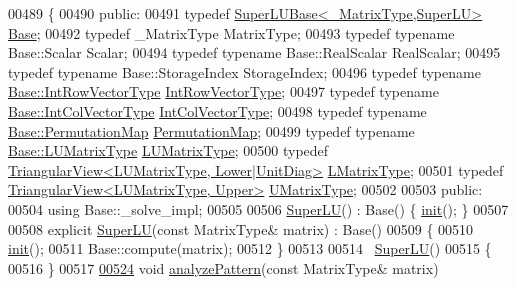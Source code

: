 \begin{DoxyCode}
00489 \{
00490   \textcolor{keyword}{public}:
00491     \textcolor{keyword}{typedef} \hyperlink{class_eigen_1_1_super_l_u_base}{SuperLUBase<\_MatrixType,SuperLU>} 
      \hyperlink{class_eigen_1_1_super_l_u_base}{Base};
00492     \textcolor{keyword}{typedef} \_MatrixType MatrixType;
00493     \textcolor{keyword}{typedef} \textcolor{keyword}{typename} Base::Scalar Scalar;
00494     \textcolor{keyword}{typedef} \textcolor{keyword}{typename} Base::RealScalar RealScalar;
00495     \textcolor{keyword}{typedef} \textcolor{keyword}{typename} Base::StorageIndex StorageIndex;
00496     \textcolor{keyword}{typedef} \textcolor{keyword}{typename} \hyperlink{group___core___module}{Base::IntRowVectorType} 
      \hyperlink{group___core___module}{IntRowVectorType};
00497     \textcolor{keyword}{typedef} \textcolor{keyword}{typename} \hyperlink{group___core___module}{Base::IntColVectorType} 
      \hyperlink{group___core___module}{IntColVectorType};   
00498     \textcolor{keyword}{typedef} \textcolor{keyword}{typename} \hyperlink{group___core___module_class_eigen_1_1_map}{Base::PermutationMap} \hyperlink{group___core___module_class_eigen_1_1_map}{PermutationMap};
00499     \textcolor{keyword}{typedef} \textcolor{keyword}{typename} \hyperlink{group___sparse_core___module}{Base::LUMatrixType} \hyperlink{group___sparse_core___module}{LUMatrixType};
00500     \textcolor{keyword}{typedef} \hyperlink{group___core___module_class_eigen_1_1_triangular_view}{TriangularView<LUMatrixType, Lower|UnitDiag>}  
      \hyperlink{group___core___module_class_eigen_1_1_triangular_view}{LMatrixType};
00501     \textcolor{keyword}{typedef} \hyperlink{group___core___module_class_eigen_1_1_triangular_view}{TriangularView<LUMatrixType,  Upper>}          
      \hyperlink{group___core___module_class_eigen_1_1_triangular_view}{UMatrixType};
00502 
00503   \textcolor{keyword}{public}:
00504     \textcolor{keyword}{using} Base::\_solve\_impl;
00505 
00506     \hyperlink{class_eigen_1_1_super_l_u}{SuperLU}() : Base() \{ \hyperlink{structinit}{init}(); \}
00507 
00508     \textcolor{keyword}{explicit} \hyperlink{class_eigen_1_1_super_l_u}{SuperLU}(\textcolor{keyword}{const} MatrixType& matrix) : Base()
00509     \{
00510       \hyperlink{structinit}{init}();
00511       Base::compute(matrix);
00512     \}
00513 
00514     ~\hyperlink{class_eigen_1_1_super_l_u}{SuperLU}()
00515     \{
00516     \}
00517     
\hyperlink{class_eigen_1_1_super_l_u_a493cdfada27415a6037b004ff974eace}{00524}     \textcolor{keywordtype}{void} \hyperlink{class_eigen_1_1_super_l_u_a493cdfada27415a6037b004ff974eace}{analyzePattern}(\textcolor{keyword}{const} MatrixType& matrix)

\end{DoxyCode}
